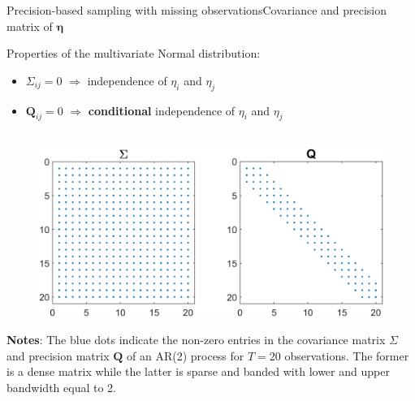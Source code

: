\documentclass[xcolor=svgnames, 10pt, aspectratio=169]{beamer}
\begin{document}
\begin{frame}{Precision-based sampling with missing observations}{Covariance and precision matrix of $\boldsymbol{\eta}$}

    Properties of the multivariate Normal distribution: 
    \begin{itemize}
        \item $\Sigma_{ij} = 0$ $\Longrightarrow$ independence of $\eta_i$ and $\eta_j$
        \item $\mathbf{Q}_{ij} = 0$ $\Longrightarrow$ \textbf{conditional} independence of $\eta_i$ and $\eta_j$ \\~\\
    \end{itemize}    

    \begin{adjustbox}{minipage=0.7\textwidth,center}
        \begin{figure}
            \includegraphics[scale = 0.65]{fig_Sigma_Q.png}  \vspace{0.1cm} \\
        \end{figure}
            {\tiny \textbf{Notes}: The blue dots indicate the non-zero entries in the covariance matrix $\Sigma$ and precision matrix $\mathbf{Q}$ of an AR(2) process for $T=20$ observations. The former is a dense matrix while the latter is sparse and banded with lower and upper bandwidth equal to 2.}\par
    \end{adjustbox}
\end{frame}
\end{document}
